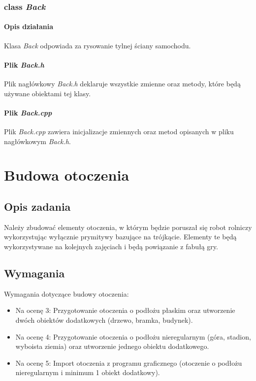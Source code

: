 \documentclass[a4paper, 12pt]{report}
\begin{document}
\subsection{class \emph{Back}}
\subsubsection{Opis działania}
Klasa \emph{Back} odpowiada za rysowanie tylnej ściany samochodu.

\subsubsection{Plik \emph{Back.h}}
Plik nagłówkowy \emph{Back.h} deklaruje wszystkie zmienne oraz metody, które będą używane obiektami tej klasy.


\subsubsection{Plik \emph{Back.cpp}}
Plik \emph{Back.cpp} zawiera inicjalizacje zmiennych oraz metod opisanych w pliku nagłówkowym \emph{Back.h}.


\chapter{Budowa otoczenia}
\section{Opis zadania}
Należy zbudować elementy otoczenia, w którym będzie poruszał się robot rolniczy wykorzystując wyłącznie prymitywy bazujące na trójkącie. Elementy te będą wykorzystywane na kolejnych zajęciach i będą powiązanie z fabułą gry.
\section{Wymagania}
Wymagania dotyczące budowy otoczenia:
\begin{itemize}
\item Na ocenę 3: Przygotowanie otoczenia o podłożu płaskim oraz utworzenie dwóch obiektów dodatkowych (drzewo, bramka, budynek).
\item Na ocenę 4: Przygotowanie otoczenia o podłożu nieregularnym (góra, stadion, wyboista ziemia) oraz utworzenie jednego obiektu dodatkowego.
\item Na ocenę 5: Import otoczenia z programu graficznego (otoczenie o podłożu nieregularnym i minimum 1 obiekt dodatkowy).
\end{itemize}
\end{document}
